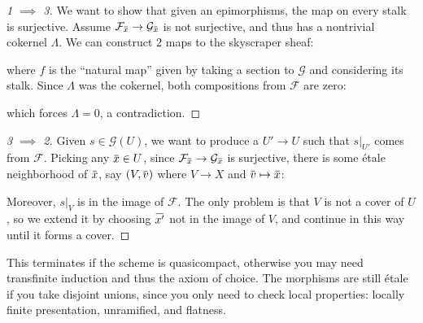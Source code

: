 \begin{proof}[1 $\implies$ 3]

We want to show that given an epimorphisms, the map on every stalk is
surjective. Assume
\(\mathcal{F}_{\mkern 1.5mu\overline{\mkern-1.5mux\mkern-1.5mu}\mkern 1.5mu} \to \mathcal{G}_{\mkern 1.5mu\overline{\mkern-1.5mux\mkern-1.5mu}\mkern 1.5mu}\)
is not surjective, and thus has a nontrivial cokernel \(\Lambda\). We
can construct 2 maps to the skyscraper sheaf:

where \(f\) is the ``natural map'' given by taking a section to
\(\mathcal{G}\) and considering its stalk. Since \(\Lambda\) was the
cokernel, both compositions from \(\mathcal{F}\) are zero:

which forces \(\Lambda = 0\), a contradiction.

\end{proof}

\begin{proof}[3 $\implies$ 2]

Given \(s\in \mathcal{G}(U)\), we want to produce a \(U' \to U\) such
that \({ \left.{{s}} \right|_{{U'}} }\) comes from \(\mathcal{F}\).
Picking any
\(\mkern 1.5mu\overline{\mkern-1.5mux\mkern-1.5mu}\mkern 1.5mu\in U\),
since
\(\mathcal{F}_{\mkern 1.5mu\overline{\mkern-1.5mux\mkern-1.5mu}\mkern 1.5mu} \to \mathcal{G}_{\mkern 1.5mu\overline{\mkern-1.5mux\mkern-1.5mu}\mkern 1.5mu}\)
is surjective, there is some étale neighborhood of
\(\mkern 1.5mu\overline{\mkern-1.5mux\mkern-1.5mu}\mkern 1.5mu\), say
\((V, \mkern 1.5mu\overline{\mkern-1.5muv\mkern-1.5mu}\mkern 1.5mu)\)
where \(V\to X\) and
\(\mkern 1.5mu\overline{\mkern-1.5muv\mkern-1.5mu}\mkern 1.5mu \mapsto \mkern 1.5mu\overline{\mkern-1.5mux\mkern-1.5mu}\mkern 1.5mu\):

Moreover, \({ \left.{{s}} \right|_{{V}} }\) is in the image of
\(\mathcal{F}\). The only problem is that \(V\) is not a cover of \(U\),
so we extend it by choosing
\(\mkern 1.5mu\overline{\mkern-1.5mux'\mkern-1.5mu}\mkern 1.5mu\) not in
the image of \(V\), and continue in this way until it forms a cover.

\end{proof}

\begin{remark}

This terminates if the scheme is quasicompact, otherwise you may need
transfinite induction and thus the axiom of choice. The morphisms are
still étale if you take disjoint unions, since you only need to check
local properties: locally finite presentation, unramified, and flatness.

\end{remark}


